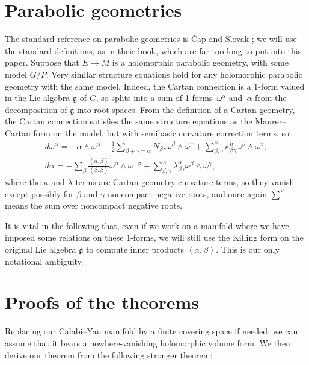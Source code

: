 \documentclass[11pt]{article}
\newcommand{\gtot}{\mathfrak{g}}
\begin{document}
\section{Parabolic geometries}

The standard reference on parabolic
geometries is \v{C}ap and Slovak \cite{Cap/Slovak:2009};
we will use the standard def\/initions, as in their
book, which are far too long to put into this paper.
Suppose that $E \to M$ is a holomorphic
parabolic geometry, with some model $G/P$.
Very similar structure equations hold for any
holomorphic parabolic geometry with the same model. Indeed,
the Cartan connection is a 1-form valued in the Lie
algebra $\mathfrak{g}$ of $G$, so splits into a sum
of 1-forms~$\omega^{\alpha}$ and~$\alpha$ from the
decomposition of $\mathfrak{g}$ into root spaces.
From the def\/inition of a Cartan geometry, the
Cartan connection satisf\/ies the same structure
equations as the Maurer--Cartan form on the model,
but with semibasic curvature correction terms, so
\begin{gather*}
d \omega^{\alpha}  = - \alpha \wedge \omega^{\alpha} - \frac{1}{2}
\sum_{\beta + \gamma=\alpha} N_{\beta \gamma} \omega^{\beta} \wedge \omega^{\gamma}
+
\sum^{\times}_{\beta, \gamma}
\kappa^{\alpha}_{\beta \gamma} \omega^{\beta} \wedge \omega^{\gamma},
\\
d \alpha  =
-
\sum_{\beta} \frac{\left<\alpha,\beta\right>}
{\left<\beta,\beta\right>} \omega^{\beta} \wedge \omega^{-\beta}
+
\sum^{\times}_{\beta, \gamma}
\lambda^{\alpha}_{\beta \gamma} \omega^{\beta} \wedge \omega^{\gamma},
\end{gather*}
where the $\kappa$ and $\lambda$ terms are Cartan geometry
curvature terms, so they vanish except possibly for
$\beta$ and $\gamma$ noncompact negative roots, and
once again $\displaystyle{\sum^{\times}}$ means
the sum over noncompact negative roots.

It is vital in the following that, even if we
work on a manifold where we have imposed some
relations on these 1-forms, we will still use the
Killing form on the original Lie algebra $\gtot$
to compute inner products $\left<\alpha,\beta\right>$.
This is our only notational ambiguity.

\section{Proofs of the theorems}

Replacing our Calabi--Yau manifold by a f\/inite covering space
if needed, we can assume that it
bears a nowhere-vanishing holomorphic volume
form. We then derive our theorem from the following stronger theorem:
\end{document}

